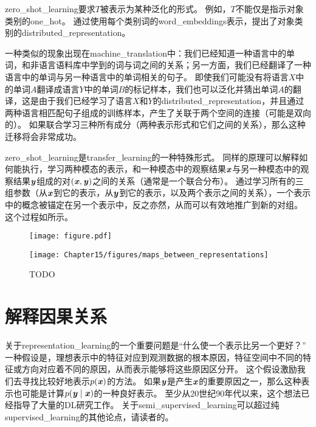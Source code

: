 
\gls{zero_shot_learning}要求$T$被表示为某种泛化的形式。
例如，$T$不能仅是指示对象类别的\gls{one_hot}。
通过使用每个类别词的\gls{word_embeddings}表示，\cite{Socher-2013}提出了对象类别的\gls{distributed_representation}。


一种类似的现象出现在\gls{machine_translation}中\citep{Klementiev-et-al-COLING2012,Mikolov-et-al-arxiv2013,Gouws-et-al-arxiv2014}：我们已经知道一种语言中的单词，和非语言语料库中学到的词与词之间的关系；另一方面，我们已经翻译了一种语言中的单词与另一种语言中的单词相关的句子。
即使我们可能没有将语言$X$中的单词$A$翻译成语言$Y$中的单词$B$的标记样本，我们也可以泛化并猜出单词$A$的翻译，这是由于我们已经学习了语言$X$和$Y$的\gls{distributed_representation}，并且通过两种语言相匹配句子组成的训练样本，产生了关联于两个空间的连接（可能是双向的）。
如果联合学习三种所有成分（两种表示形式和它们之间的关系），那么这种迁移将会非常成功。


\gls{zero_shot_learning}是\gls{transfer_learning}的一种特殊形式。
同样的原理可以解释如何能执行，学习两种模态的表示，和一种模态中的观察结果$\boldsymbol{\mathit{x}}$与另一种模态中的观察结果$\boldsymbol{\mathit{y}}$组成的对$(\boldsymbol{\mathit{x}}, \boldsymbol{\mathit{y}})$之间的关系（通常是一个联合分布）\citep{Srivastava+Salakhutdinov-NIPS2012-small}。
通过学习所有的三组参数（从$\boldsymbol{\mathit{x}}$到它的表示，从$\boldsymbol{\mathit{y}}$到它的表示，以及两个表示之间的关系），一个表示中的概念被锚定在另一个表示中，反之亦然，从而可以有效地推广到新的对组。
这个过程如所示。

\begin{figure}[!htb]
\ifOpenSource
\centerline{\texttt{[image: figure.pdf]}}
\else
\centerline{\texttt{[image: Chapter15/figures/maps\_between\_representations]}}
\fi
\caption{TODO}
\label{fig:chap15_maps_between_representations}
\end{figure}


\section{解释因果关系}
\label{sec:semi_supervised_disentangling_of_causal_factors}
关于\gls{representation_learning}的一个重要问题是``什么使一个表示比另一个更好？''
一种假设是，理想表示中的特征对应到观测数据的根本原因，特征空间中不同的特征或方向对应着不同的原因，从而表示能够将这些原因区分开。
这个假设激励我们去寻找比较好地表示$p(\boldsymbol{\mathit{x}})$的方法。
如果$\boldsymbol{\mathit{y}}$是产生$\boldsymbol{\mathit{x}}$的重要原因之一，那么这种表示也可能是计算$p(\boldsymbol{\mathit{y}} \mid \boldsymbol{\mathit{x}})$的一种良好表示。
至少从20世纪90年代以来，这个想法已经指导了大量的\gls{DL}研究工作\citep{Becker92,hinton1999unsupervised}。
关于\gls{semi_supervised_learning}可以超过纯\gls{supervised_learning}的其他论点，请读者\cite{Chapelle-2006}的。


